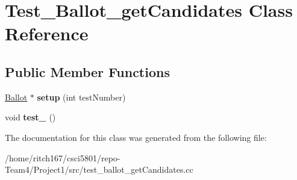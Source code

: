\hypertarget{classTest__Ballot__getCandidates}{}\section{Test\+\_\+\+Ballot\+\_\+get\+Candidates Class Reference}
\label{classTest__Ballot__getCandidates}
\subsection*{Public Member Functions}
\begin{DoxyCompactItemize}
\item 
\mbox{\label{classTest__Ballot__getCandidates_a401c451779cacfc533ef65b41c926dd1}} 
\hyperlink{classBallot}{Ballot} $\ast$ {\bfseries setup} (int test\+Number)
\item 
\mbox{\label{classTest__Ballot__getCandidates_aac7c01a743dff3ac7cf1b98b3aff1155}} 
void {\bfseries test\+\_} ()
\end{DoxyCompactItemize}


The documentation for this class was generated from the following file\+:\begin{DoxyCompactItemize}
\item 
/home/ritch167/csci5801/repo-\/\+Team4/\+Project1/src/test\+\_\+ballot\+\_\+get\+Candidates.\+cc\end{DoxyCompactItemize}
